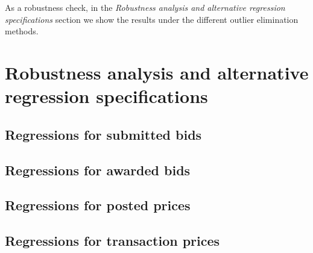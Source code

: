 As a robustness check, in the \textit{Robustness analysis and alternative regression specifications} section we show the results under the different outlier elimination methods.


\section{Robustness analysis and alternative regression 
 specifications}\label{app:robustness}


\subsection{Regressions for submitted bids}







\subsection{Regressions for awarded bids}




\subsection{Regressions for posted prices}



\subsection{Regressions for transaction prices}


